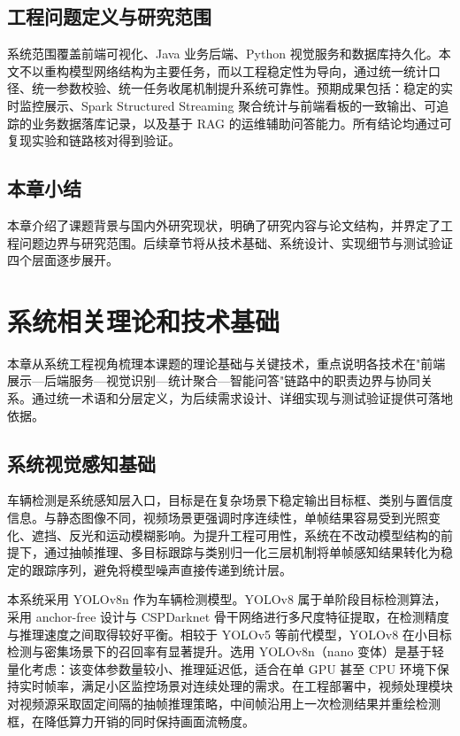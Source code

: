 \documentclass{wzuthesis} %
\begin{document}
\section{工程问题定义与研究范围}

系统范围覆盖前端可视化、Java 业务后端、Python 视觉服务和数据库持久化。本文不以重构模型网络结构为主要任务，而以工程稳定性为导向，通过统一统计口径、统一参数校验、统一任务收尾机制提升系统可靠性。预期成果包括：稳定的实时监控展示、Spark Structured Streaming 聚合统计与前端看板的一致输出、可追踪的业务数据落库记录，以及基于 RAG 的运维辅助问答能力。所有结论均通过可复现实验和链路核对得到验证。

\section{本章小结}

本章介绍了课题背景与国内外研究现状，明确了研究内容与论文结构，并界定了工程问题边界与研究范围。后续章节将从技术基础、系统设计、实现细节与测试验证四个层面逐步展开。


\chapter{系统相关理论和技术基础}

本章从系统工程视角梳理本课题的理论基础与关键技术，重点说明各技术在"前端展示—后端服务—视觉识别—统计聚合—智能问答"链路中的职责边界与协同关系。通过统一术语和分层定义，为后续需求设计、详细实现与测试验证提供可落地依据。

\section{系统视觉感知基础}

车辆检测是系统感知层入口，目标是在复杂场景下稳定输出目标框、类别与置信度信息。与静态图像不同，视频场景更强调时序连续性，单帧结果容易受到光照变化、遮挡、反光和运动模糊影响。为提升工程可用性，系统在不改动模型结构的前提下，通过抽帧推理、多目标跟踪与类别归一化三层机制将单帧感知结果转化为稳定的跟踪序列，避免将模型噪声直接传递到统计层。

本系统采用 YOLOv8n 作为车辆检测模型。YOLOv8 属于单阶段目标检测算法，采用 anchor-free 设计与 CSPDarknet 骨干网络进行多尺度特征提取，在检测精度与推理速度之间取得较好平衡。相较于 YOLOv5 等前代模型，YOLOv8 在小目标检测与密集场景下的召回率有显著提升。选用 YOLOv8n（nano 变体）是基于轻量化考虑：该变体参数量较小、推理延迟低，适合在单 GPU 甚至 CPU 环境下保持实时帧率，满足小区监控场景对连续处理的需求。在工程部署中，视频处理模块对视频源采取固定间隔的抽帧推理策略，中间帧沿用上一次检测结果并重绘检测框，在降低算力开销的同时保持画面流畅度。
\end{document}
